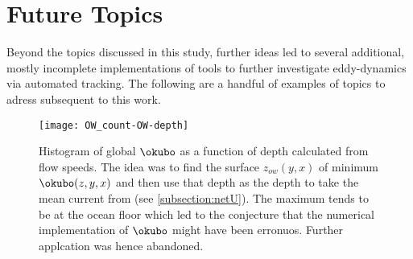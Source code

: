 \section{Future Topics}

Beyond the topics discussed in this study, further ideas led to several additional, mostly incomplete implementations of tools to further investigate eddy-dynamics via automated tracking. The following are a handful of examples of topics to adress subsequent to this work. 

\begin{figure}
	\texttt{[image: OW\_count-OW-depth]}
	\caption{Histogram of global $\okubo$ as a function of depth calculated from \POP flow speeds. The idea was to find the surface $z_{ow}(y,x)$ of minimum $\okubo(z,y,x)$ and then use that depth as the depth to take the mean current from (see \cref{subsection:netU}). The maximum tends to be at the ocean floor which led to the conjecture that the numerical implementation of $\okubo$ might have been erronuos. Further applcation was hence abandoned.  }
	\label{fig:OW_count-OW-depth}
\end{figure}


